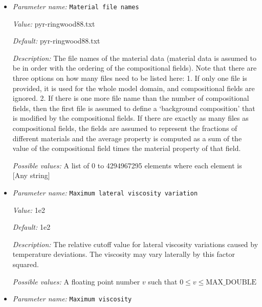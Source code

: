 \begin{itemize}
{\it Value:} temp-viscosity-prefactor.txt


{\it Default:} temp-viscosity-prefactor.txt


{\it Description:} The file name of the lateral viscosity data. 


{\it Possible values:} Any string
\item {\it Parameter name:} {\tt Material file names}
\label{parameters:Material model/Steinberger model/Material file names}


{\it Value:} pyr-ringwood88.txt


{\it Default:} pyr-ringwood88.txt


{\it Description:} The file names of the material data (material data is assumed to be in order with the ordering of the compositional fields). Note that there are three options on how many files need to be listed here: 1. If only one file is provided, it is used for the whole model domain, and compositional fields are ignored. 2. If there is one more file name than the number of compositional fields, then the first file is assumed to define a `background composition' that is modified by the compositional fields. If there are exactly as many files as compositional fields, the fields are assumed to represent the fractions of different materials and the average property is computed as a sum of the value of the compositional field times the material property of that field.


{\it Possible values:} A list of 0 to 4294967295 elements where each element is [Any string]
\item {\it Parameter name:} {\tt Maximum lateral viscosity variation}
\label{parameters:Material model/Steinberger model/Maximum lateral viscosity variation}


{\it Value:} 1e2


{\it Default:} 1e2


{\it Description:} The relative cutoff value for lateral viscosity variations caused by temperature deviations. The viscosity may vary laterally by this factor squared.


{\it Possible values:} A floating point number $v$ such that $0 \leq v \leq \text{MAX\_DOUBLE}$
\item {\it Parameter name:} {\tt Maximum viscosity}
\label{parameters:Material model/Steinberger model/Maximum viscosity}



\end{itemize}
